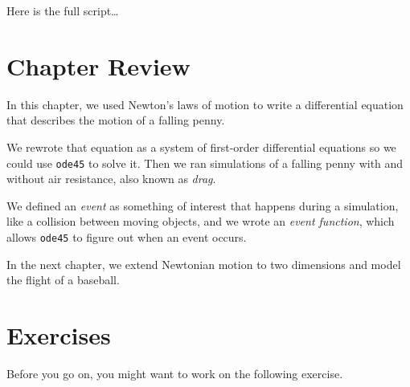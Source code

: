 Here is the full script\dots


\section{Chapter Review}

In this chapter, we used Newton's laws of motion to write a differential equation that describes the motion of a falling penny.

We rewrote that equation as a system of first-order differential equations so we could use \lstinline{ode45} to solve it.  Then we ran simulations of a falling penny with and without air resistance, also known as \emph{drag}.

We defined an \emph{event} as something of interest that happens during a simulation, like a collision between moving objects, and we wrote an \emph{event function}, which allows \lstinline{ode45} to figure out when an event occurs.

In the next chapter, we extend Newtonian motion to two dimensions and model the flight of a baseball.


\section{Exercises}

Before you go on, you might want to work on the following exercise.

